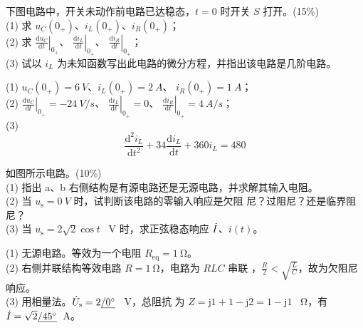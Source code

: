 \documentclass[a4paper,12pt]{examdesign}
\def\Varangle#1{\kern.75pt\vtop{\hbox{\kern-.75pt$/{#1}$}\kern-.35pt\hrule}}
\begin{document}
\begin{shortanswer}[title={第一部分}]
\begin{question}
    下图电路中，开关未动作前电路已达稳态，$t=0$ 时开关 $S$ 打开。\hfill(15\%)\\
    (1) 求 $u_C(0_+)$、$i_L(0_+)$、$i_R(0_+)$；\\
    (2) 求 $\left.\frac{\mathrm{d}u_C}{\mathrm{d}t}\right|_{0_+}$、
    $\left.\frac{\mathrm{d}i_L}{\mathrm{d}t}\right|_{0_+}$、
    $\left.\frac{\mathrm{d}i_R}{\mathrm{d}t}\right|_{0_+}$； \\
    (3) 试以 $i_L$ 为未知函数写出此电路的微分方程，并指出该电路是几阶电路。
    \begin{figure}[H]
    \hfill
    
    \end{figure}
    \examvspace*{15.5cm}
    \begin{answer}
        (1) $u_C(0_+)=\SI{6}{V}$、$i_L(0_+)=\SI{2}{A}$、
        $i_R(0_+)=\SI{1}{A}$；\\
        (2)
        $\left.\frac{\mathrm{d}u_C}{\mathrm{d}t}\right|_{0_+}=\SI{-24}{V/s}$、
        $\left.\frac{\mathrm{d}i_L}{\mathrm{d}t}\right|_{0_+}=0$、
        $\left.\frac{\mathrm{d}i_R}{\mathrm{d}t}\right|_{0_+}=\SI{4}{A/s}$；\\
        (3) \[
        \frac{\mathrm{d}^2i_L}{\mathrm{d}t^2} + 34
        \frac{\mathrm{d}i_L}{\mathrm{d}t} + 360 i_L = 480
        \]
    \end{answer}
\end{question}

\begin{question}
    如图所示电路。\hfill(10\%) \\
    (1) 指出 a、b 右侧结构是有源电路还是无源电路，并求解其输入电阻。 \\
    (2) 当 $u_\mathrm{s}=\SI{0}{V}$ 时，试判断该电路的零输入响应是欠阻
    尼？过阻尼？还是临界阻尼？\\
    (3) 当 $u_\mathrm{s}=2\sqrt{2}\cos t$ \SI{}{V} 时，求正弦稳态响应
    $\dot I$、$i(t)$。
    \begin{figure}[H]
    \hfill
    
    \end{figure}
    \examvspace*{15cm}
    \begin{answer}
        (1) 无源电路。等效为一个电阻 $R_\mathrm{eq}=\SI{1}{\ohm}$。 \\
        (2) 右侧并联结构等效电路 $R=\SI{1}{\ohm}$，电路为 $RLC$ 串联
        ，$\frac{R}{2} < \sqrt{\frac{L}{C}}$，故为欠阻尼响应。\\
        (3) 用相量法。$\dot{U}_\mathrm{s}=2\Varangle{\ang{0}}$ \SI{}{V}，总阻抗
        为 $Z=\mathrm{j}1+1-\mathrm{j}2=1-\mathrm{j}1$ \SI{}{\ohm}，有
        $\dot{I}=\sqrt{2}\Varangle{\ang{45}}$\SI{}{A}。
    \end{answer}
\end{question}

\end{shortanswer}
\end{document}
